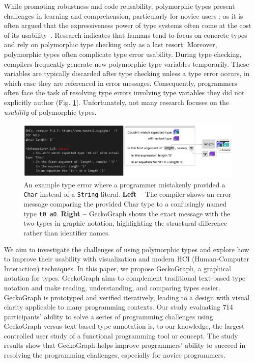\documentclass[preprint,12pt]{elsarticle}
\begin{document}

While promoting robustness and code reusability, polymorphic types present challenges in learning and comprehension, particularly for novice users \cite{Jun2000-ec, Jun2000-yu}; as it is often argued that the expressiveness power of type systems often come at the cost of its usability~\cite{Hage2020-hg}. Research indicates that humans tend to focus on concrete types and rely on polymorphic type checking only as a last resort. Moreover, polymorphic types often complicate type error usability. During type checking, compilers frequently generate new polymorphic type variables temporarily. These variables are typically discarded after type checking unless a type error occurs, in which case they are referenced in error messages. Consequently, programmers often face the task of resolving type errors involving type variables they did not explicitly author (Fig. \ref{fig:example-foldable}). Unfortunately, not many research focuses on the \textit{usability} of polymorphic types. 

\begin{figure}[]
  \includegraphics[width=\linewidth]{figures/Foldable}
  \caption{\label{fig:example-foldable} An example type error where a programmer mistakenly provided a \texttt{Char} instead of a \texttt{String} literal. \textbf{Left --} The compiler shows an error message comparing the provided Char type to a confusingly named type \texttt{t0 a0}. \textbf{Right --} GeckoGraph shows the exact message with the two types in graphic notation, highlighting the structural difference rather than identifier names.}
\end{figure}

 We aim to investigate the challenges of using polymorphic types and explore how to improve their usability with visualization and modern HCI (Human-Computer Interaction) techniques. In this paper, we propose GeckoGraph, a graphical notation for types. GeckoGraph aims to complement traditional text-based type notation and make reading, understanding, and comparing types easier. GeckoGraph is prototyped and verified iteratively, leading to a design with visual clarity applicable to many programming contexts. Our study evaluating 714 participants' ability to solve a series of programming challenges using GeckoGraph versus text-based type annotation is, to our knowledge, the largest controlled user study of a functional programming tool or concept. The study results show that GeckoGraph helps improve programmers' ability to succeed in resolving the programming challenges, especially for novice programmers.
\end{document}
